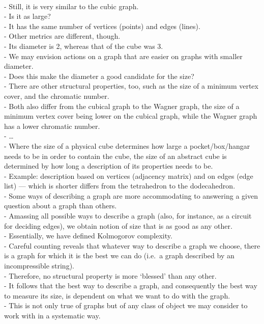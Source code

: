 {  \\- Still, it is very similar to the cubic graph.
  \\- Is it as large?
  \\- It has the same number of vertices (points) and edges (lines).
  \\- Other metrics are different, though.
  \\- Its diameter is 2, whereas that of the cube was 3.
  \\- We may envision actions on a graph that are easier on graphs with smaller diameter.
  \\- Does this make the diameter a good candidate for the size?
  \\- There are other structural properties, too, such as the size of a minimum vertex cover, and the chromatic number.
  \\- Both also differ from the cubical graph to the Wagner graph, the size of a minimum vertex cover being lower on the cubical graph, while the Wagner graph has a lower chromatic number.
  \\- \ldots
  \\- Where the size of a physical cube determines how large a pocket/box/hangar needs to be in order to contain the cube, the size of an abstract cube is determined by how long a description of its properties needs to be.
  \\- Example: description based on vertices (adjacency matrix) and on edges (edge list) --- which is shorter differs from the tetrahedron to the dodecahedron.
  \\- Some ways of describing a graph are more accommodating to answering a given question about a graph than others.
  \\- Amassing all possible ways to describe a graph (also, for instance, as a circuit for deciding edges), we obtain notion of size that is as good as any other.
  \\- Essentially, we have defined Kolmogorov complexity.
  \\- Careful counting reveals that whatever way to describe a graph we choose, there is a graph for which it is the best we can do (i.e.~a graph described by an incompressible string).
  \\- Therefore, no structural property is more `blessed' than any other.
  \\- It follows that the best way to describe a graph, and consequently the best way to measure its size, is dependent on what we want to do with the graph.
  \\- This is not only true of graphs but of any class of object we may consider to work with in a systematic way.
}



